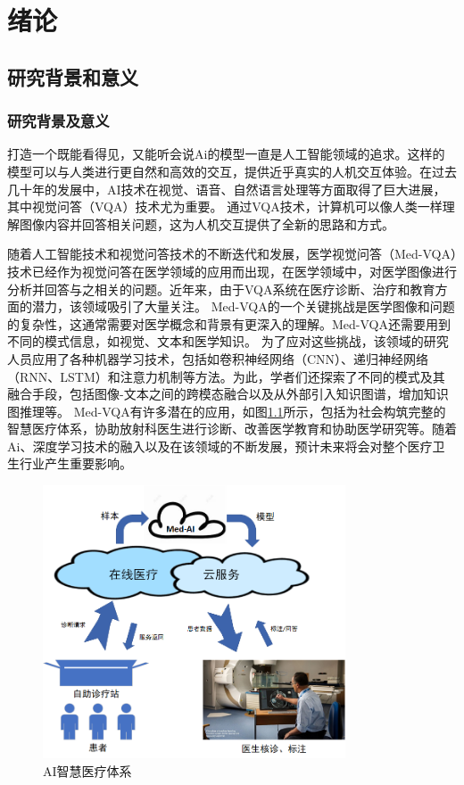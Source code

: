 \chapter{绪论}
%
\section{研究背景和意义}
\subsection{研究背景及意义}
打造一个既能看得见，又能听会说Ai的模型一直是人工智能领域的追求。这样的模型可以与人类进行更自然和高效的交互，提供近乎真实的人机交互体验。在过去几十年的发展中，AI技术在视觉、语音、自然语言处理等方面取得了巨大进展，其中视觉问答（VQA）技术尤为重要。
通过VQA技术\cite{yu2015visual}，计算机可以像人类一样理解图像内容并回答相关问题\cite{wu2017visual}，这为人机交互提供了全新的思路和方式。

随着人工智能技术和视觉问答技术的不断迭代和发展，医学视觉问答（Med-VQA）技术已经作为视觉问答在医学领域的应用而出现，在医学领域中，对医学图像进行分析并回答与之相关的问题。近年来，由于VQA系统在医疗诊断、治疗和教育方面的潜力，该领域吸引了大量关注。
Med-VQA的一个关键挑战是医学图像和问题的复杂性，这通常需要对医学概念和背景有更深入的理解。Med-VQA还需要用到不同的模式信息，如视觉、文本和医学知识。
为了应对这些挑战，该领域的研究人员应用了各种机器学习技术，包括如卷积神经网络（CNN）、递归神经网络（RNN、LSTM）和注意力机制等方法。为此，学者们还探索了不同的模式及其融合手段，包括图像-文本之间的跨模态融合以及从外部引入知识图谱，增加知识图推理等。
Med-VQA有许多潜在的应用，如图\ref{sys_medaicloud}所示，包括为社会构筑完整的智慧医疗体系，协助放射科医生进行诊断、改善医学教育和协助医学研究等。随着Ai、深度学习技术的融入以及在该领域的不断发展，预计未来将会对整个医疗卫生行业产生重要影响。
\begin{figure}[htbp]
	\centering	
	\includegraphics[width=0.8\textwidth]{Fig/myfig/chapter1/sys_medaicloud.png}  %
	\caption{\label{sys_medaicloud}AI智慧医疗体系} 
\end{figure}


